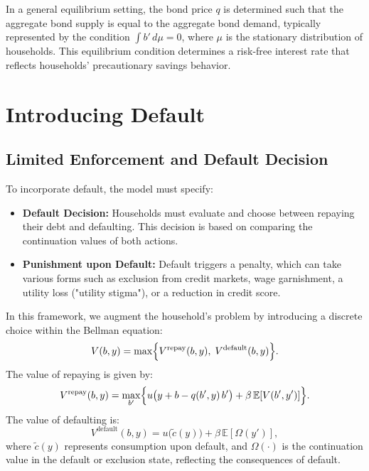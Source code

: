 \documentclass[acmsmall]{acmart}
\begin{document}
In a general equilibrium setting, the bond price $q$ is determined such that the aggregate bond supply is equal to the aggregate bond demand, typically represented by the condition $\int b' \, d\mu = 0$, where $\mu$ is the stationary distribution of households. This equilibrium condition determines a risk-free interest rate that reflects households' precautionary savings behavior.

\section*{Introducing Default}

\subsection*{Limited Enforcement and Default Decision}

To incorporate default, the model must specify:

\begin{itemize}
    \item \textbf{Default Decision:} Households must evaluate and choose between repaying their debt and defaulting. This decision is based on comparing the continuation values of both actions.
    \item \textbf{Punishment upon Default:} Default triggers a penalty, which can take various forms such as exclusion from credit markets, wage garnishment, a utility loss ("utility stigma"), or a reduction in credit score.
\end{itemize}

In this framework, we augment the household's problem by introducing a discrete choice within the Bellman equation:
\begin{equation}
V(b, y) = \max \Bigl\{V^\text{repay}(b,y), \;V^\text{default}(b,y)\Bigr\}.
\end{equation}
The value of repaying is given by:
\begin{equation}
V^\text{repay}(b,y) = \max_{b'} \Bigl\{
    u\bigl(y + b - q(b',y)\,b'\bigr)
    + \beta \,\mathbb{E}[V(b',y')]
  \Bigr\}.
\end{equation}
The value of defaulting is:
\begin{equation}
V^\text{default}(b,y) = u\bigl(\tilde{c}(y)\bigr) + \beta \,\mathbb{E}[\Omega(y')],
\end{equation}
where $\tilde{c}(y)$ represents consumption upon default, and $\Omega(\cdot)$ is the continuation value in the default or exclusion state, reflecting the consequences of default.
\end{document}
